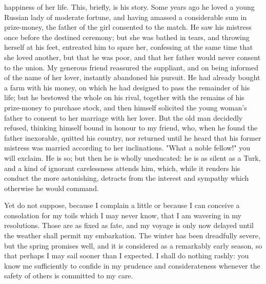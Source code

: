 happiness of her life. This, briefly, is his story. Some years ago he loved a young Russian lady of moderate fortune, and having amassed a considerable sum in prize-money, the father of the girl consented to the match. He saw his mistress once before the destined ceremony; but she was bathed in tears, and throwing herself at his feet, entreated him to spare her, confessing at the same time that she loved another, but that he was poor, and that her father would never consent to the union. My generous friend reassured the suppliant, and on being informed of the name of her lover, instantly abandoned his pursuit. He had already bought a farm with his money, on which he had designed to pass the remainder of his life; but he bestowed the whole on his rival, together with the remains of his prize-money to purchase stock, and then himself solicited the young woman's father to consent to her marriage with her lover. But the old man decidedly refused, thinking himself bound in honour to my friend, who, when he found the father inexorable, quitted his country, nor returned until he heard that his former mistress was married according to her inclinations. "What a noble fellow!" you will exclaim. He is so; but then he is wholly uneducated: he is as silent as a Turk, and a kind of ignorant carelessness attends him, which, while it renders his conduct the more astonishing, detracts from the interest and sympathy which otherwise he would command.

Yet do not suppose, because I complain a little or because I can conceive a consolation for my toils which I may never know, that I am wavering in my resolutions. Those are as fixed as fate, and my voyage is only now delayed until the weather shall permit my embarkation. The winter has been dreadfully severe, but the spring promises well, and it is considered as a remarkably early season, so that perhaps I may sail sooner than I expected. I shall do nothing rashly: you know me sufficiently to confide in my prudence and considerateness whenever the safety of others is committed to my care.


